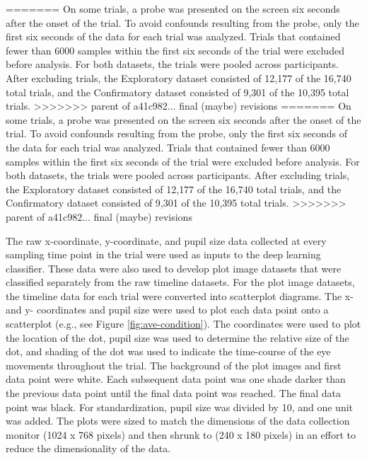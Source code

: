 \documentclass[
  english,
  man, donotrepeattitle,floatsintext]{apa6}
\begin{document}
=======
On some trials, a probe was presented on the screen six seconds after the onset of the trial. To avoid confounds resulting from the probe, only the first six seconds of the data for each trial was analyzed. Trials that contained fewer than 6000 samples within the first six seconds of the trial were excluded before analysis. For both datasets, the trials were pooled across participants. After excluding trials, the Exploratory dataset consisted of 12,177 of the 16,740 total trials, and the Confirmatory dataset consisted of 9,301 of the 10,395 total trials.
>>>>>>> parent of a41c982... final (maybe) revisions
=======
On some trials, a probe was presented on the screen six seconds after the onset of the trial. To avoid confounds resulting from the probe, only the first six seconds of the data for each trial was analyzed. Trials that contained fewer than 6000 samples within the first six seconds of the trial were excluded before analysis. For both datasets, the trials were pooled across participants. After excluding trials, the Exploratory dataset consisted of 12,177 of the 16,740 total trials, and the Confirmatory dataset consisted of 9,301 of the 10,395 total trials.
>>>>>>> parent of a41c982... final (maybe) revisions

The raw x-coordinate, y-coordinate, and pupil size data collected at every sampling time point in the trial were used as inputs to the deep learning classifier. These data were also used to develop plot image datasets that were classified separately from the raw timeline datasets. For the plot image datasets, the timeline data for each trial were converted into scatterplot diagrams. The x- and y- coordinates and pupil size were used to plot each data point onto a scatterplot (e.g., see Figure \ref{fig:ave-condition}). The coordinates were used to plot the location of the dot, pupil size was used to determine the relative size of the dot, and shading of the dot was used to indicate the time-course of the eye movements throughout the trial. The background of the plot images and first data point were white. Each subsequent data point was one shade darker than the previous data point until the final data point was reached. The final data point was black. For standardization, pupil size was divided by 10, and one unit was added. The plots were sized to match the dimensions of the data collection monitor (1024 x 768 pixels) and then shrunk to (240 x 180 pixels) in an effort to reduce the dimensionality of the data.
\end{document}
